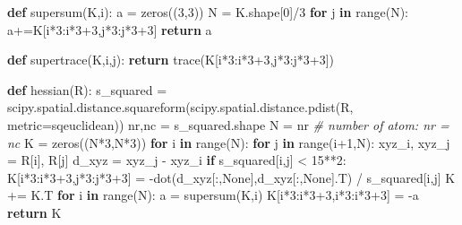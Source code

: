 \documentclass[
]{article}
\newenvironment{Shaded}{}{}
\newcommand{\BuiltInTok}[1]{\textcolor[rgb]{0.00,0.50,0.00}{#1}}
\newcommand{\CommentTok}[1]{\textcolor[rgb]{0.38,0.63,0.69}{\textit{#1}}}
\newcommand{\ControlFlowTok}[1]{\textcolor[rgb]{0.00,0.44,0.13}{\textbf{#1}}}
\newcommand{\DecValTok}[1]{\textcolor[rgb]{0.25,0.63,0.44}{#1}}
\newcommand{\KeywordTok}[1]{\textcolor[rgb]{0.00,0.44,0.13}{\textbf{#1}}}
\newcommand{\NormalTok}[1]{#1}
\newcommand{\OperatorTok}[1]{\textcolor[rgb]{0.40,0.40,0.40}{#1}}
\newcommand{\StringTok}[1]{\textcolor[rgb]{0.25,0.44,0.63}{#1}}
\newcommand{\VariableTok}[1]{\textcolor[rgb]{0.10,0.09,0.49}{#1}}
\begin{document}
\begin{Shaded}
\begin{Highlighting}[]
\KeywordTok{def}\NormalTok{ supersum(K,i):}
\NormalTok{    a }\OperatorTok{=}\NormalTok{ zeros((}\DecValTok{3}\NormalTok{,}\DecValTok{3}\NormalTok{))}
\NormalTok{    N }\OperatorTok{=}\NormalTok{ K.shape[}\DecValTok{0}\NormalTok{]}\OperatorTok{/}\DecValTok{3}
    \ControlFlowTok{for}\NormalTok{ j }\KeywordTok{in} \BuiltInTok{range}\NormalTok{(N):}
\NormalTok{        a}\OperatorTok{+=}\NormalTok{K[i}\OperatorTok{*}\DecValTok{3}\NormalTok{:i}\OperatorTok{*}\DecValTok{3}\OperatorTok{+}\DecValTok{3}\NormalTok{,j}\OperatorTok{*}\DecValTok{3}\NormalTok{:j}\OperatorTok{*}\DecValTok{3}\OperatorTok{+}\DecValTok{3}\NormalTok{]}
    \ControlFlowTok{return}\NormalTok{ a}

\KeywordTok{def}\NormalTok{ supertrace(K,i,j):}
    \ControlFlowTok{return}\NormalTok{ trace(K[i}\OperatorTok{*}\DecValTok{3}\NormalTok{:i}\OperatorTok{*}\DecValTok{3}\OperatorTok{+}\DecValTok{3}\NormalTok{,j}\OperatorTok{*}\DecValTok{3}\NormalTok{:j}\OperatorTok{*}\DecValTok{3}\OperatorTok{+}\DecValTok{3}\NormalTok{])}

\KeywordTok{def}\NormalTok{ hessian(R):}
\NormalTok{    s\_squared }\OperatorTok{=}\NormalTok{ scipy.spatial.distance.squareform(scipy.spatial.distance.pdist(R, metric}\OperatorTok{=}\StringTok{\textquotesingle{}sqeuclidean\textquotesingle{}}\NormalTok{))}
\NormalTok{    nr,nc }\OperatorTok{=}\NormalTok{ s\_squared.shape}
\NormalTok{    N }\OperatorTok{=}\NormalTok{ nr }\CommentTok{\# number of atom: nr = nc}
\NormalTok{    K }\OperatorTok{=}\NormalTok{ zeros((N}\OperatorTok{*}\DecValTok{3}\NormalTok{,N}\OperatorTok{*}\DecValTok{3}\NormalTok{))}
    \ControlFlowTok{for}\NormalTok{ i }\KeywordTok{in} \BuiltInTok{range}\NormalTok{(N):}
        \ControlFlowTok{for}\NormalTok{ j }\KeywordTok{in} \BuiltInTok{range}\NormalTok{(i}\OperatorTok{+}\DecValTok{1}\NormalTok{,N):}
\NormalTok{            xyz\_i, xyz\_j }\OperatorTok{=}\NormalTok{ R[i], R[j]}
\NormalTok{            d\_xyz }\OperatorTok{=}\NormalTok{ xyz\_j }\OperatorTok{{-}}\NormalTok{ xyz\_i}
            \ControlFlowTok{if}\NormalTok{ s\_squared[i,j] }\OperatorTok{\textless{}} \DecValTok{15}\OperatorTok{**}\DecValTok{2}\NormalTok{:}
\NormalTok{                K[i}\OperatorTok{*}\DecValTok{3}\NormalTok{:i}\OperatorTok{*}\DecValTok{3}\OperatorTok{+}\DecValTok{3}\NormalTok{,j}\OperatorTok{*}\DecValTok{3}\NormalTok{:j}\OperatorTok{*}\DecValTok{3}\OperatorTok{+}\DecValTok{3}\NormalTok{] }\OperatorTok{=} \OperatorTok{{-}}\NormalTok{dot(d\_xyz[:,}\VariableTok{None}\NormalTok{],d\_xyz[:,}\VariableTok{None}\NormalTok{].T) }\OperatorTok{/}\NormalTok{ s\_squared[i,j]}
\NormalTok{    K }\OperatorTok{+=}\NormalTok{ K.T}
    \ControlFlowTok{for}\NormalTok{ i }\KeywordTok{in} \BuiltInTok{range}\NormalTok{(N):}
\NormalTok{        a }\OperatorTok{=}\NormalTok{ supersum(K,i)}
\NormalTok{        K[i}\OperatorTok{*}\DecValTok{3}\NormalTok{:i}\OperatorTok{*}\DecValTok{3}\OperatorTok{+}\DecValTok{3}\NormalTok{,i}\OperatorTok{*}\DecValTok{3}\NormalTok{:i}\OperatorTok{*}\DecValTok{3}\OperatorTok{+}\DecValTok{3}\NormalTok{] }\OperatorTok{=} \OperatorTok{{-}}\NormalTok{a}
    \ControlFlowTok{return}\NormalTok{ K}



\end{Highlighting}
\end{Shaded}
\end{document}
